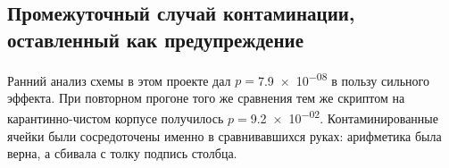 \subsection{Промежуточный случай контаминации, оставленный как
предупреждение}

Ранний анализ схемы в этом проекте дал $p={}$\num{7.9e-08} в пользу
сильного эффекта. При повторном прогоне того же сравнения тем же скриптом
на карантинно-чистом корпусе получилось $p={}$\num{9.2e-02}\live.
Контаминированные ячейки были сосредоточены именно в сравнивавшихся руках:
арифметика была верна, а сбивала с толку подпись столбца.
